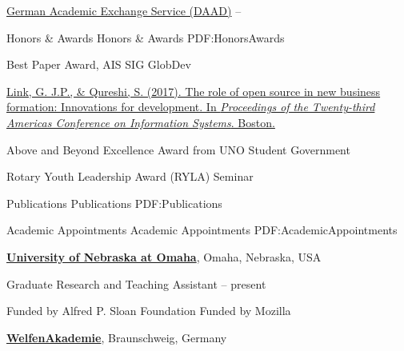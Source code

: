 \documentclass[letterpaper,MMMyyyy,nonstopmode]{simpleresumecv}
\begin{document}
\begin{Body}
\BulletItem
\href{https://www.daad.de/en/}
{German Academic Exchange Service (DAAD)}
\hfill
{} -- 



\Section
{Honors \&\newline
Awards}
{Honors \& Awards}
{PDF:HonorsAwards}


\BulletItem
Best Paper Award, AIS SIG GlobDev
\hfill
{}
\begin{Detail}
\SubBulletItem
\href{http://aisel.aisnet.org/amcis2017/ICTs/Presentations/18/}
{
Link, G. J.P., \& Qureshi, S. (2017). The role of open source in new business formation: Innovations for development. In \textit{Proceedings of the Twenty-third Americas Conference on Information Systems}. Boston.
}
\end{Detail}

\BulletItem
Above and Beyond Excellence Award from UNO Student Government
\hfill
{}


\BulletItem
Rotary Youth Leadership Award (RYLA) Seminar
\hfill
{}



\newpage

\Section
{Publications}
{Publications}
{PDF:Publications}




\newpage




\Section
{Academic Appointments}
{Academic Appointments}
{PDF:AcademicAppointments}

\Entry
\href{http://unomaha.edu/}
{\textbf{University of Nebraska at Omaha}},
Omaha, Nebraska, USA

\Gap
\BulletItem
Graduate Research and Teaching Assistant
\hfill
{} -- 
present
\begin{Detail}
\SubBulletItem
Funded by Alfred P. Sloan Foundation
\SubBulletItem
Funded by Mozilla
\end{Detail}

\BigGap
\Entry
\href{http://www.welfenakademie.de/}
{\textbf{WelfenAkademie}},
Braunschweig, Germany


\end{Body}
\end{document}

